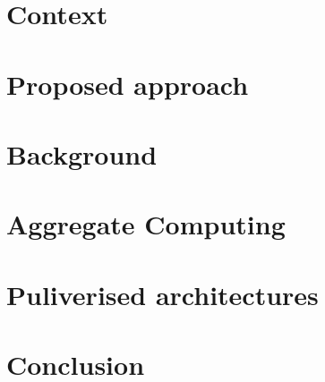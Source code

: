 \documentclass[aspectratio=169, 9pt]{beamer}
\begin{document}


\section{Context}
%

\section{Proposed approach}

\section{Background}
\section{Aggregate Computing}





\section{Puliverised architectures}




\section{Conclusion}



\end{document}
